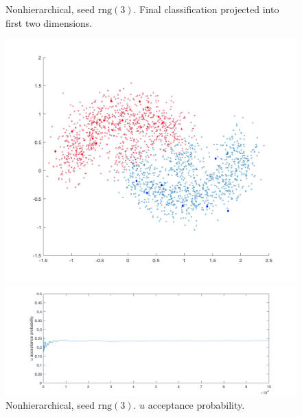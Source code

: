 \documentclass{siamart1116}
\begin{document}
\begin{figure}[!htb]
\begin{minipage}{0.48\textwidth}
    \centering
    \caption{\label{fig:moons_nonhier1_scatter} Nonhierarchical, seed $\text{rng}(3)$. Final classification projected into first two dimensions.}
    \includegraphics[width=\linewidth]{moons/nonhier1/scatter.png}
\end{minipage} \hfill
\begin{minipage}{0.48\textwidth}
    \centering
    \caption{\label{fig:moons_nonhier1_u_accept} Nonhierarchical, seed $\text{rng}(3)$. $u$ acceptance probability.}
    \includegraphics[width=\linewidth]{moons/nonhier1/u_accept.png}
\end{minipage}
\end{figure}
\end{document}
